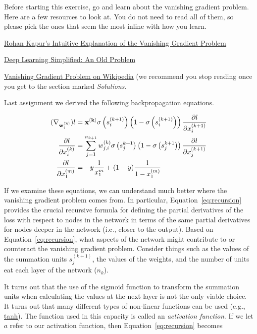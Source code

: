 \documentclass[assignment07_Solutions]{subfiles}
\begin{document}
\begin{exercise}[(30-90 minutes)]
Before starting this exercise, go and learn about the vanishing gradient problem.  Here are a few resources to look at.  You do not need to read all of them, so please pick the ones that seem the most inline with how you learn.
\begin{externalresources}
\bi
\item \href{https://ayearofai.com/rohan-4-the-vanishing-gradient-problem-ec68f76ffb9b}{Rohan Kapur's Intuitive Explanation of the Vanishing Gradient Problem}
\item \href{https://www.youtube.com/watch?v=SKMpmAOUa2Q}{Deep Learning Simplified: An Old Problem}
\item \href{https://en.wikipedia.org/wiki/Vanishing_gradient_problem}{Vanishing Gradient Problem on Wikipedia} (we recommend you stop reading once you get to the section marked \emph{Solutions}.
\ei
\end{externalresources}


Last assignment we derived the following backpropagation equations.

\begin{align}
(\nabla_{\mathbf{w^{(k)}_i}}) l &= \mathbf{x^{(k)}} \sigma\left (s_i^{(k+1)} \right )\left (1-\sigma\left (s_i^{(k+1)} \right )\right) \frac{\partial l}{\partial x_i^{(k+1)}} \\
\frac{\partial l}{\partial x^{(k)}_i} &= \sum_{j=1}^{n_{k+1}} w^{(k)}_{j,i} \sigma \left ( s_{j}^{k+1} \right) \left (1-\sigma \left ( s_{j}^{k+1} \right)\right) \frac{\partial l}{\partial x^{(k+1)}_j} \label{eq:recursion} \\
\frac{\partial l}{\partial x^{(m)}_1} &= -y\frac{1}{x_1^{m}} + (1-y) \frac{1}{1-x_1^{(m)}} 
\end{align}

\bes
\item If we examine these equations, we can understand much better where the vanishing gradient problem comes from.  In particular, Equation~\ref{eq:recursion} provides the crucial recursive formula for defining the partial derivatives of the loss with respect to nodes in the network in terms of the same partial derivatives for nodes deeper in the network (i.e., closer to the output).  Based on Equation~\ref{eq:recursion}, what aspects of the network might contribute to or counteract the vanishing gradient problem.  Consider things such as the values of the summation units $s_j^{(k+1)}$, the values of the weights, and the number of units eat each layer of the network ($n_k$).
\item It turns out that the use of the sigmoid function to transform the summation units when calculating the values at the next layer is not the only viable choice. It turns out that many different types of non-linear functions can be used (e.g., \href{http://mathworld.wolfram.com/HyperbolicTangent.html}{tanh}).  The function used in this capacity is called an \emph{activation function}.  If we let $a$ refer to our activation function, then Equation~\ref{eq:recursion} becomes


\end{exercise}
\end{document}
